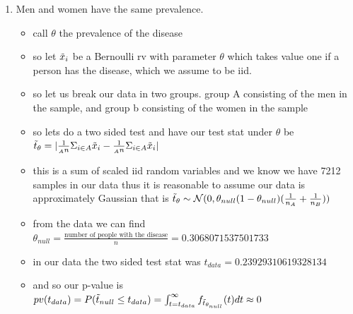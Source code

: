\documentclass[12pt,twoside]{article}
\begin{document}
\begin{enumerate}
\begin{enumerate}
\item Men and women have the same prevalence.
\begin{itemize}
    \color{blue}
\item call $\theta$ the  prevalence of the disease 
    \item so let $\Tilde{x}_i$ be a Bernoulli rv with parameter $\theta$ which takes value one if a person has the disease, which we assume to be iid. 
    \item so let us break our data in two groups. group A consisting of the men in the sample, and group b consisting of the women in the sample
    \item so lets do a two sided test and have our test stat under $\theta$ be $\Tilde{t}_{\theta}=|\frac{1}{_An}\Sigma_{i\in A}\Tilde{x}_i-\frac{1}{_An}\Sigma_{i\in A}\Tilde{x}_i|$
    \item this is a sum of scaled  iid random variables and we know we have 7212 samples in our data thus it is reasonable to assume our data is approximately Gaussian that is $\Tilde{t}_{\theta}\sim \mathcal{N}(0, {\theta_{null}(1-\theta_{null}})({\frac{1}{n_A}+\frac{1}{n_B}}))$ 
    \item from the data we can find $\theta_{null}=\frac{\text{number of people with the disease}}{n}=0.3068071537501733$
    \item in our data the two sided test stat was $t_{data}=0.23929310619328134$
    \item and so our p-value is $pv(t_{data})=P(\Tilde{t}_{null}\leq t_{data})=\int_{t=t_{data}}^{\infty}f_{\Tilde{t}_{\theta_{null}}}(t)dt\approx 0$
\end{itemize}

\end{enumerate}

\end{enumerate}
\end{document}
